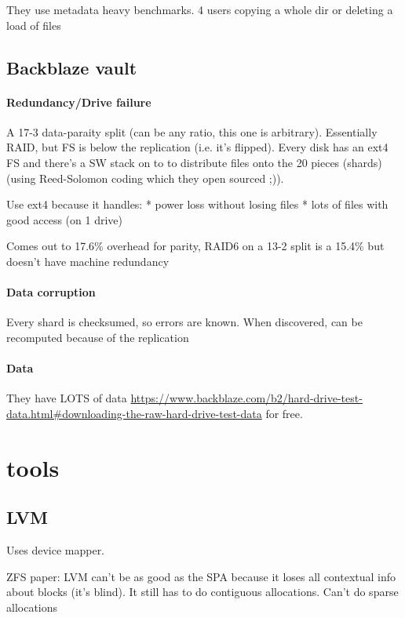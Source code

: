 \documentclass[a4paper]{report}
\begin{document}
        They use metadata heavy benchmarks. 4 users copying a whole dir or
        deleting a load of files

    \subsection{Backblaze vault}
        \paragraph{Redundancy/Drive failure}

        A 17-3 data-paraity split (can be any ratio, this one is arbitrary).
        Essentially RAID, but FS is below the replication (i.e. it's flipped).
        Every disk has an ext4 FS and there's a SW stack on to to distribute
        files onto the 20 pieces (shards) (using Reed-Solomon coding which they
        open sourced ;)).

        Use ext4 because it handles:
        * power loss without losing files
        * lots of files with good access (on 1 drive)

        Comes out to 17.6\% overhead for parity, RAID6 on a 13-2 split is a
        15.4\% but doesn't have machine redundancy

        \paragraph{Data corruption}

        Every shard is checksumed, so errors are known. When discovered, can be
        recomputed because of the replication

        \paragraph{Data}
        They have LOTS of data
        \url{https://www.backblaze.com/b2/hard-drive-test-data.html#downloading-the-raw-hard-drive-test-data}
        for free.


\section{tools}
    \subsection{LVM}
        Uses device mapper.

        ZFS paper: LVM can't be as good as the SPA because it loses all contextual
        info about blocks (it's blind). It still has to do contiguous allocations.
        Can't do sparse allocations
\end{document}
